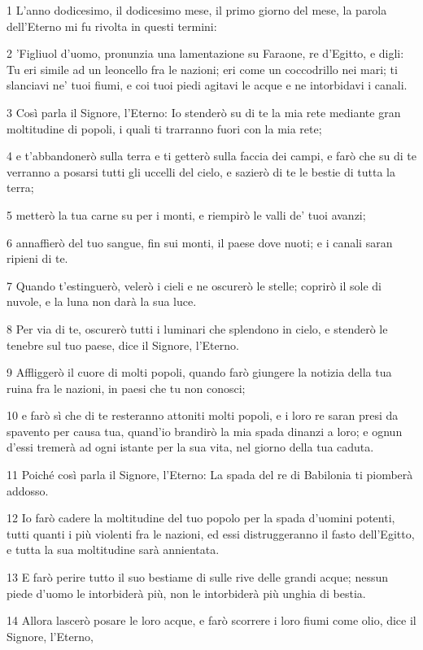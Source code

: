 \par 1 L'anno dodicesimo, il dodicesimo mese, il primo giorno del mese, la parola dell'Eterno mi fu rivolta in questi termini:
\par 2 'Figliuol d'uomo, pronunzia una lamentazione su Faraone, re d'Egitto, e digli: Tu eri simile ad un leoncello fra le nazioni; eri come un coccodrillo nei mari; ti slanciavi ne' tuoi fiumi, e coi tuoi piedi agitavi le acque e ne intorbidavi i canali.
\par 3 Così parla il Signore, l'Eterno: Io stenderò su di te la mia rete mediante gran moltitudine di popoli, i quali ti trarranno fuori con la mia rete;
\par 4 e t'abbandonerò sulla terra e ti getterò sulla faccia dei campi, e farò che su di te verranno a posarsi tutti gli uccelli del cielo, e sazierò di te le bestie di tutta la terra;
\par 5 metterò la tua carne su per i monti, e riempirò le valli de' tuoi avanzi;
\par 6 annaffierò del tuo sangue, fin sui monti, il paese dove nuoti; e i canali saran ripieni di te.
\par 7 Quando t'estinguerò, velerò i cieli e ne oscurerò le stelle; coprirò il sole di nuvole, e la luna non darà la sua luce.
\par 8 Per via di te, oscurerò tutti i luminari che splendono in cielo, e stenderò le tenebre sul tuo paese, dice il Signore, l'Eterno.
\par 9 Affliggerò il cuore di molti popoli, quando farò giungere la notizia della tua ruina fra le nazioni, in paesi che tu non conosci;
\par 10 e farò sì che di te resteranno attoniti molti popoli, e i loro re saran presi da spavento per causa tua, quand'io brandirò la mia spada dinanzi a loro; e ognun d'essi tremerà ad ogni istante per la sua vita, nel giorno della tua caduta.
\par 11 Poiché così parla il Signore, l'Eterno: La spada del re di Babilonia ti piomberà addosso.
\par 12 Io farò cadere la moltitudine del tuo popolo per la spada d'uomini potenti, tutti quanti i più violenti fra le nazioni, ed essi distruggeranno il fasto dell'Egitto, e tutta la sua moltitudine sarà annientata.
\par 13 E farò perire tutto il suo bestiame di sulle rive delle grandi acque; nessun piede d'uomo le intorbiderà più, non le intorbiderà più unghia di bestia.
\par 14 Allora lascerò posare le loro acque, e farò scorrere i loro fiumi come olio, dice il Signore, l'Eterno,
